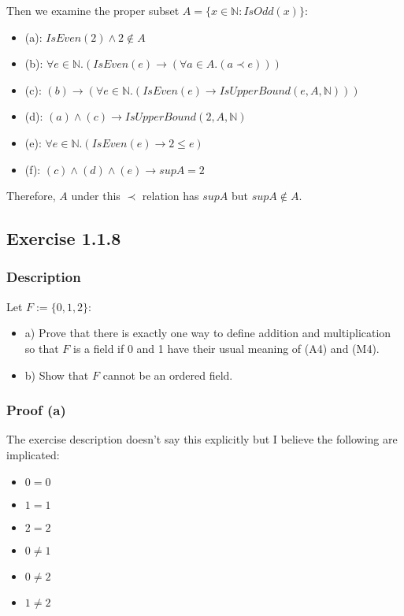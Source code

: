 \documentclass[12pt, letterpaper, oneside]{book}
\begin{document}
Then we examine the proper subset $A = \{ x \in \mathbb{N}: IsOdd(x) \}$:
\begin{itemize}
  \item (a): $IsEven(2) \land 2 \notin A$
  \item (b): $\forall e \in \mathbb{N}. (IsEven(e) \rightarrow (\forall a \in A. (a \prec e)))$
  \item (c): $(b) \rightarrow (\forall e \in \mathbb{N}. (IsEven(e) \rightarrow IsUpperBound(e, A, \mathbb{N})))$
  \item (d): $(a) \land (c) \rightarrow IsUpperBound(2, A, \mathbb{N})$
  \item (e): $\forall e \in \mathbb{N}. (IsEven(e) \rightarrow 2 \le e)$
  \item (f): $(c) \land (d) \land (e) \rightarrow sup A = 2$
\end{itemize}

Therefore, $A$ under this $\prec$ relation has $sup A$ but $sup A \notin A$.

\subsection{Exercise 1.1.8}

\subsubsection{Description}

Let $F := \{ 0, 1, 2 \}$:
\begin{itemize}
  \item a) Prove that there is exactly one way to define addition and multiplication so that $F$ is a field if 0 and 1
        have their usual meaning of (A4) and (M4).
  \item b) Show that $F$ cannot be an ordered field.
\end{itemize}

\subsubsection{Proof (a)}

The exercise description doesn't say this explicitly but I believe the following are implicated:
\begin{itemize}
  \item $0 = 0$
  \item $1 = 1$
  \item $2 = 2$
  \item $0 \ne 1$
  \item $0 \ne 2$
  \item $1 \ne 2$
\end{itemize}
\end{document}
